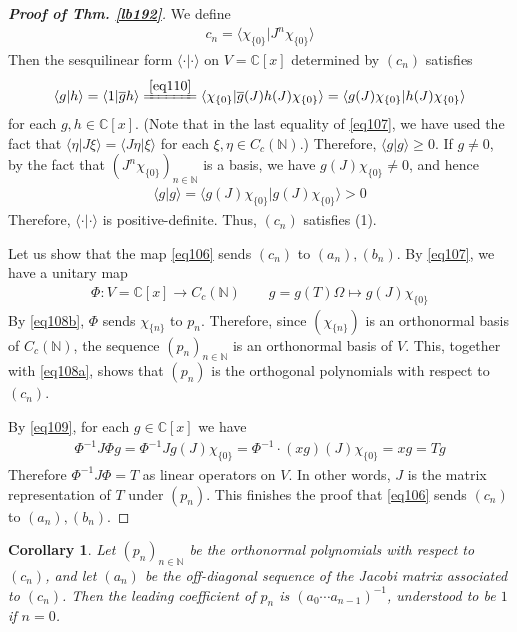 \documentclass[12pt,b5paper,notitlepage]{article}
\theoremstyle{definition}
\theoremstyle{plain}
\newtheorem{co}[df]{Corollary}
\newcommand{\ovl}{\overline}
\newcommand{\bk}[1]{\langle {#1}\rangle}
\newcommand{\Cbb}{\mathbb C}
\newcommand{\Nbb}{\mathbb N}
\numberwithin{equation}{section}
\begin{document}
\begin{proof}[\textbf{Proof of Thm. \ref{lb192}}]
We define
\begin{align}\label{eq110}
c_n=\bk{\chi_{\{0\}}|J^n\chi_{\{0\}}}
\end{align}
Then the sesquilinear form $\bk{\cdot|\cdot}$ on $V=\Cbb[x]$ determined by $(c_n)$ satisfies
\begin{align}\label{eq107}
\bk{g|h}=\bk{1|\ovl gh}\xlongequal{\eqref{eq110}}\bk{\chi_{\{0\}}|\ovl g(J)h(J)\chi_{\{0\}}}=\bk{g(J)\chi_{\{0\}}|h(J)\chi_{\{0\}}}
\end{align}
for each $g,h\in\Cbb[x]$. (Note that in the last equality of \eqref{eq107}, we have used the fact that $\bk{\eta|J\xi}=\bk{J\eta|\xi}$ for each $\xi,\eta\in C_c(\Nbb)$.) Therefore, $\bk{g|g}\geq0$. If $g\neq0$, by the fact that $(J^n\chi_{\{0\}})_{n\in\Nbb}$ is a basis, we have $g(J)\chi_{\{0\}}\neq0$, and hence
\begin{align*}
\bk{g|g}=\bk{g(J)\chi_{\{0\}}|g(J)\chi_{\{0\}}}>0
\end{align*}
Therefore, $\bk{\cdot|\cdot}$ is positive-definite. Thus, $(c_n)$ satisfies (1).

Let us show that the map \eqref{eq106} sends $(c_n)$ to $(a_n),(b_n)$. By \eqref{eq107}, we have a unitary map
\begin{gather}\label{eq109}
\Phi:V=\Cbb[x]\rightarrow C_c(\Nbb)\qquad g=g(T)\Omega\mapsto g(J)\chi_{\{0\}} 
\end{gather}
By \eqref{eq108b}, $\Phi$ sends $\chi_{\{n\}}$ to $p_n$. Therefore, since $(\chi_{\{n\}})$ is an orthonormal basis of $C_c(\Nbb)$, the sequence $(p_n)_{n\in\Nbb}$ is an orthonormal basis of $V$. This, together with \eqref{eq108a}, shows that $(p_n)$ is the orthogonal polynomials with respect to $(c_n)$. 

By \eqref{eq109}, for each $g\in\Cbb[x]$ we have
\begin{align*}
\Phi^{-1}J\Phi g=\Phi^{-1}Jg(J)\chi_{\{0\}}=\Phi^{-1}\cdot(xg)(J)\chi_{\{0\}}=xg=Tg
\end{align*}
Therefore $\Phi^{-1}J\Phi=T$ as linear operators on $V$. In other words, $J$ is the matrix representation of $T$ under $(p_n)$. This finishes the proof that \eqref{eq106} sends $(c_n)$ to $(a_n),(b_n)$.
\end{proof}



\begin{co}\label{lb197}
Let $(p_n)_{n\in\Nbb}$ be the orthonormal polynomials with respect to $(c_n)$, and let $(a_n)$ be the off-diagonal sequence of the Jacobi matrix associated to $(c_n)$. Then the leading coefficient of $p_n$ is $(a_0\cdots a_{n-1})^{-1}$, understood to be $1$ if $n=0$.
\end{co}
\end{document}
